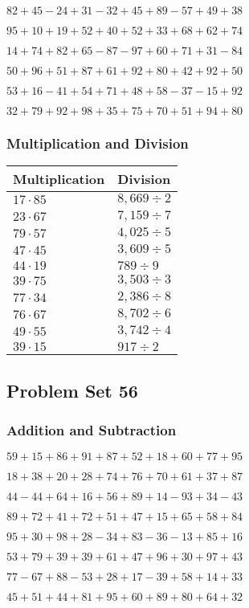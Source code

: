 \(82+45-24+31-32+45+89-57+49+38\)

\(95+10+19+52+40+52+33+68+62+74\)

\(14+74+82+65-87-97+60+71+31-84\)

\(50+96+51+87+61+92+80+42+92+50\)

\(53+16-41+54+71+48+58-37-15+92\)

\(32+79+92+98+35+75+70+51+94+80\)

\hypertarget{multiplication-and-division-95}{%
\subsubsection{Multiplication and
Division}\label{multiplication-and-division-95}}

\begin{longtable}[]{@{}ll@{}}
\toprule
Multiplication & Division\tabularnewline
\midrule
\endhead
\(17\cdot85\) & \(8,669÷2\)\tabularnewline
\(23\cdot67\) & \(7,159÷7\)\tabularnewline
\(79\cdot57\) & \(4,025÷5\)\tabularnewline
\(47\cdot45\) & \(3,609÷5\)\tabularnewline
\(44\cdot19\) & \(789÷9\)\tabularnewline
\(39\cdot75\) & \(3,503÷3\)\tabularnewline
\(77\cdot34\) & \(2,386÷8\)\tabularnewline
\(76\cdot67\) & \(8,702÷6\)\tabularnewline
\(49\cdot55\) & \(3,742÷4\)\tabularnewline
\(39\cdot15\) & \(917÷2\)\tabularnewline
\bottomrule
\end{longtable}

\hypertarget{problem-set-56}{%
\subsection{Problem Set 56}\label{problem-set-56}}

\hypertarget{addition-and-subtraction-96}{%
\subsubsection{Addition and
Subtraction}\label{addition-and-subtraction-96}}

\(59+15+86+91+87+52+18+60+77+ 95\)

\(18+38+20+28+74+76+70+61+37+87\)

\(44-44+64+16+56+89+14-93+34-43\)

\(89+72+41+72+51+47+15+65+58+84\)

\(95+30+98+28-34+83-36-13+85+16\)

\(53+79+39+39+61+47+96+30+97+43\)

\(77-67+88-53+28+17-39+58+14+33\)

\(45+51+44+81+95+60+89+80+64+32\)


